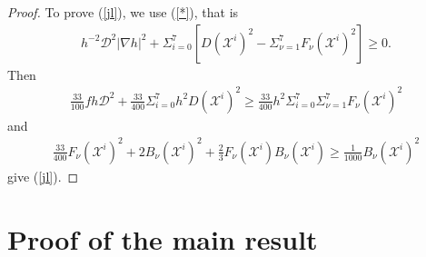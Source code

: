 \documentclass[10pt,a4paper]{amsart}
\numberwithin{equation}{section}
\begin{document}
\begin{proof}
    To prove (\ref{jl}), we use (\ref{*}), that is
    \begin{align*}
        h^{-2}\mathcal{D}^2|\nabla h|^2+\Sigma_{i=0}^7[D(\mathscr{X}^i)^2-\Sigma_{\nu=1}^7F_\nu(\mathscr{X}^i)^2]\geq 0.    \end{align*}
        Then
\begin{align*}
        \frac{33}{100}fh\mathcal{D}^2+\frac{33}{400}\Sigma_{i=0}^7h^2D(\mathscr{X}^i)^2   \geq  \frac{33}{400}h^2\Sigma_{i=0}^7\Sigma_{\nu=1}^7F_\nu(\mathscr{X}^i)^2
    \end{align*}
 and 
 \begin{align*}
     \frac{33}{400}F_\nu(\mathscr{X}^i)^2+2B_\nu(\mathscr{X}^i)^2+\frac{2}{3}F_\nu(\mathscr{X}^i)B_\nu (\mathscr{X}^i)\geq \frac{1}{1000}B_\nu (\mathscr{X}^i)^2
 \end{align*}
 give (\ref{jl}).
\end{proof}



















\section{Proof of the main result }\label{s4}
\end{document}
